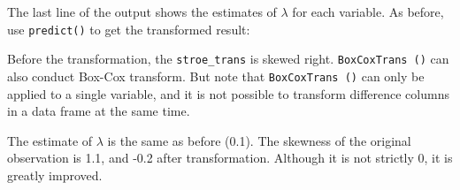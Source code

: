 \documentclass[12pt,]{krantz}
\makeatletter
\newenvironment{Shaded}{\begin{snugshade}}{\end{snugshade}}
\newcommand{\KeywordTok}[1]{\textcolor[rgb]{0.27,0.27,0.27}{\textbf{#1}}}
\newcommand{\DataTypeTok}[1]{\textcolor[rgb]{0.27,0.27,0.27}{#1}}
\newcommand{\DecValTok}[1]{\textcolor[rgb]{0.06,0.06,0.06}{#1}}
\newcommand{\StringTok}[1]{\textcolor[rgb]{0.5,0.5,0.5}{#1}}
\newcommand{\CommentTok}[1]{\textcolor[rgb]{0.37,0.37,0.37}{\textit{#1}}}
\newcommand{\OperatorTok}[1]{\textcolor[rgb]{0.43,0.43,0.43}{\textbf{#1}}}
\newcommand{\NormalTok}[1]{#1}
\newenvironment{kframe}{%
\medskip{}
\setlength{\fboxsep}{.8em}
 \def\at@end@of@kframe{}%
 \ifinner\ifhmode%
  \def\at@end@of@kframe{\end{minipage}}%
  \begin{minipage}{\columnwidth}%
 \fi\fi%
 \def\FrameCommand##1{\hskip\@totalleftmargin \hskip-\fboxsep
 \colorbox{shadecolor}{##1}\hskip-\fboxsep
     \hskip-\linewidth \hskip-\@totalleftmargin \hskip\columnwidth}%
 \MakeFramed {\advance\hsize-\width
   \@totalleftmargin\z@ \linewidth\hsize
   \@setminipage}}%
 {\par\unskip\endMakeFramed%
 \at@end@of@kframe}
\renewenvironment{Shaded}{\begin{kframe}}{\end{kframe}}
\theoremstyle{definition}
\theoremstyle{definition}
\theoremstyle{definition}
\theoremstyle{remark}
\makeatother
\begin{document}
The last line of the output shows the estimates of \(\lambda\) for each
variable. As before, use \texttt{predict()} to get the transformed
result:

\begin{Shaded}
\end{Shaded}

Before the transformation, the \texttt{stroe\_trans} is skewed right.
\texttt{BoxCoxTrans\ ()} can also conduct Box-Cox transform. But note
that \texttt{BoxCoxTrans\ ()} can only be applied to a single variable,
and it is not possible to transform difference columns in a data frame
at the same time.

\begin{Shaded}
\end{Shaded}

\begin{Shaded}
\end{Shaded}

The estimate of \(\lambda\) is the same as before (0.1). The skewness of
the original observation is 1.1, and -0.2 after transformation. Although
it is not strictly 0, it is greatly improved.
\end{document}

